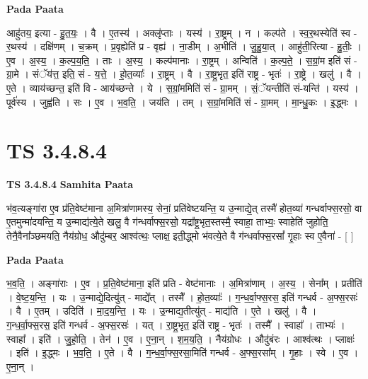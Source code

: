 \documentclass[17pt]{extarticle}
\begin{document}
\textbf{Pada Paata} \newline

आहु॑तय॒ इत्या - हु॒त॒यः॒ । वै । ए॒तस्य॑ । अक्लृ॑प्ताः । यस्य॑ । रा॒ष्ट्रम् । न । कल्प॑ते । स्व॒र॒थस्येति॑ स्व - र॒थस्य॑ । दक्षि॑णम् । च॒क्रम् । प्र॒वृह्येति॑ प्र - वृह्य॑ । ना॒डीम् । अ॒भीति॑ । जु॒हु॒या॒त् । आहु॑ती॒रित्या - हु॒तीः॒ । ए॒व । अ॒स्य॒ । क॒ल्प॒य॒ति॒ । ताः । अ॒स्य॒ । कल्प॑मानाः । रा॒ष्ट्रम् । अन्विति॑ । क॒ल्प॒ते॒ । स॒ग्रां॒म इति॑ सं - ग्रा॒मे । संॅय॑त्त॒ इति॒ सं - य॒त्ते॒ । हो॒त॒व्याः᳚ । रा॒ष्ट्रम् । वै । रा॒ष्ट्र॒भृत॒ इति॑ राष्ट्र - भृतः॑ । रा॒ष्ट्रे । खलु॑ । वै । ए॒ते । व्याय॑च्छन्त॒ इति॑ वि - आय॑च्छन्ते । ये । स॒ग्रां॒ममिति॑ सं - ग्रा॒मम् । सं॒ॅयन्तीति॑ सं-यन्ति॑ । यस्य॑ । पूर्व॑स्य । जुह्व॑ति । सः । ए॒व । भ॒व॒ति॒ । जय॑ति । तम् । स॒ग्रां॒ममिति॑ सं - ग्रा॒मम् । मा॒न्धु॒कः । इ॒द्ध्मः ।  \newline





\section{ TS 3.4.8.4 }

\textbf{TS 3.4.8.4 } \newline
\textbf{Samhita Paata} \newline

भ॑व॒त्यङ्गा॑रा ए॒व प्र॑ति॒वेष्ट॑माना अ॒मित्रा॑णामस्य॒ सेनां॒ प्रति॑वेष्टयन्ति॒ य उ॒न्माद्ये॒त् तस्मै॑ होत॒व्या॑ गन्धर्वाफ्स॒रसो॒ वा ए॒तमुन्मा॑दयन्ति॒ य उ॒न्माद्य॑त्ये॒ते खलु॒ वै ग॑न्धर्वाफ्स॒रसो॒ यद्रा᳚ष्ट्र॒भृत॒स्तस्मै॒ स्वाहा॒ ताभ्यः॒ स्वाहेति॑ जुहोति॒ तेनै॒वैना᳚ञ्छमयति॒ नैय॑ग्रोध॒ औदु॑म्बर॒ आश्व॑त्थः॒ प्लाक्ष॒ इती॒द्ध्मो भ॑वत्ये॒ते वै ग॑न्धर्वाफ्स॒रसां᳚ गृ॒हाः स्व ए॒वैना॑ - [  ] \newline

\textbf{Pada Paata} \newline

भ॒व॒ति॒ । अङ्गा॑राः । ए॒व । प्र॒ति॒वेष्ट॑माना॒ इति॑ प्रति - वेष्ट॑मानाः । अ॒मित्रा॑णाम् । अ॒स्य॒ । सेना᳚म् । प्रतीति॑ । वे॒ष्ट॒य॒न्ति॒ । यः । उ॒न्माद्ये॒दित्यु॑त् - माद्ये᳚त् । तस्मै᳚ । हो॒त॒व्याः᳚ । ग॒न्ध॒र्वा॒फ्स॒रस॒ इति॑ गन्धर्व - अ॒फ्स॒रसः॑ । वै । ए॒तम् । उदिति॑ । मा॒द॒य॒न्ति॒ । यः । उ॒न्माद्य॒तीत्यु॑त् - माद्य॑ति । ए॒ते । खलु॑ । वै । ग॒न्ध॒र्वा॒फ्स॒रस॒ इति॑ गन्धर्व - अ॒फ्स॒रसः॑ । यत् । रा॒ष्ट्र॒भृत॒ इति॑ राष्ट्र - भृतः॑ । तस्मै᳚ । स्वाहा᳚ । ताभ्यः॑ । स्वाहा᳚ । इति॑ । जु॒हो॒ति॒ । तेन॑ । ए॒व । ए॒ना॒न् । श॒म॒य॒ति॒ । नैय॑ग्रोधः । औदु॑बंरः । आश्व॑त्थः । प्लाक्षः॑ । इति॑ । इ॒द्ध्मः । भ॒व॒ति॒ । ए॒ते । वै । ग॒न्ध॒र्वा॒फ्स॒रसा॒मिति॑ गन्धर्व - अ॒फ्स॒रसा᳚म् । गृ॒हाः । स्वे । ए॒व । ए॒ना॒न् ।  \newline
\end{document}
